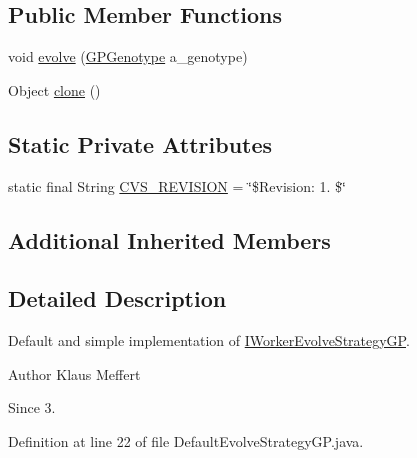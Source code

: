 \subsection*{Public Member Functions}
\begin{DoxyCompactItemize}
\item 
void \hyperlink{classorg_1_1jgap_1_1distr_1_1grid_1_1gp_1_1_default_evolve_strategy_g_p_a579c48f4d0f3b5fa3257b47d3877ccfa}{evolve} (\hyperlink{classorg_1_1jgap_1_1gp_1_1impl_1_1_g_p_genotype}{G\-P\-Genotype} a\-\_\-genotype)
\item 
Object \hyperlink{classorg_1_1jgap_1_1distr_1_1grid_1_1gp_1_1_default_evolve_strategy_g_p_aafbc4bcea7c0bd5f667b64e30b2f5730}{clone} ()
\end{DoxyCompactItemize}
\subsection*{Static Private Attributes}
\begin{DoxyCompactItemize}
\item 
static final String \hyperlink{classorg_1_1jgap_1_1distr_1_1grid_1_1gp_1_1_default_evolve_strategy_g_p_a84a173efe0853eec56d63eeabc43a945}{C\-V\-S\-\_\-\-R\-E\-V\-I\-S\-I\-O\-N} = \char`\"{}\$Revision\-: 1. \$\char`\"{}
\end{DoxyCompactItemize}
\subsection*{Additional Inherited Members}


\subsection{Detailed Description}
Default and simple implementation of \hyperlink{interfaceorg_1_1jgap_1_1distr_1_1grid_1_1gp_1_1_i_worker_evolve_strategy_g_p}{I\-Worker\-Evolve\-Strategy\-G\-P}.

\begin{DoxyAuthor}{Author}
Klaus Meffert 
\end{DoxyAuthor}
\begin{DoxySince}{Since}
3. 
\end{DoxySince}


Definition at line 22 of file Default\-Evolve\-Strategy\-G\-P.\-java.



